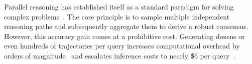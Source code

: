 \documentclass[11pt]{article}
\theoremstyle{plain}
\begin{document}




Parallel reasoning has established itself as a standard paradigm for solving complex problems~\cite{openai2024a,wang2025survey_parallel_reasoning}.
The core principle is to sample multiple independent reasoning paths and subsequently aggregate them to derive a robust consensus.
However, this accuracy gain comes at a prohibitive cost.
Generating dozens or even hundreds of trajectories per query increases computational overhead by orders of magnitude~\cite{jin2025energy} and escalates inference costs to nearly \$6 per query~\cite{nvidia2025inferencecost}.

\end{document}
